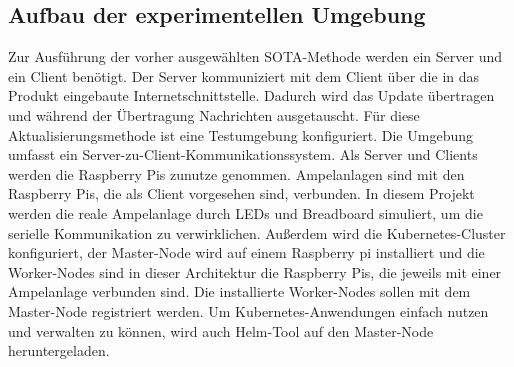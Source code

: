 \subsection{Aufbau der experimentellen Umgebung}

Zur Ausführung der vorher ausgewählten SOTA-Methode werden ein Server und ein Client benötigt. Der Server kommuniziert mit dem Client über die in das Produkt eingebaute Internetschnittstelle. Dadurch wird das Update übertragen und während der Übertragung Nachrichten ausgetauscht. Für diese Aktualisierungsmethode ist eine Testumgebung konfiguriert. Die Umgebung umfasst ein Server-zu-Client-Kommunikationssystem. Als Server und Clients werden die Raspberry Pis  zunutze genommen. Ampelanlagen sind mit den Raspberry Pis, die als Client vorgesehen sind, verbunden. In diesem Projekt werden die reale Ampelanlage durch LEDs und Breadboard simuliert, um die serielle Kommunikation zu verwirklichen.
\newline\newline
Außerdem wird die Kubernetes-Cluster konfiguriert, der Master-Node wird auf einem Raspberry pi installiert und die Worker-Nodes sind in dieser Architektur die Raspberry Pis, die jeweils mit einer Ampelanlage verbunden sind. Die installierte Worker-Nodes sollen mit dem Master-Node registriert werden. Um Kubernetes-Anwendungen einfach nutzen und verwalten zu können, wird auch Helm-Tool auf den Master-Node heruntergeladen.